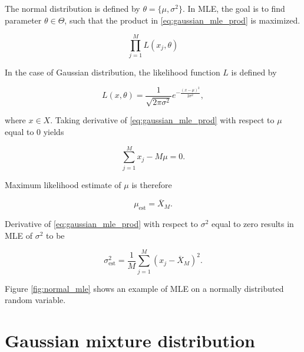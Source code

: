\documentclass[thesis=B,english]{FITthesis}[2012/06/26]
\begin{document}
The normal distribution is defined by $\theta = \{\mu, \sigma^2\}$. In MLE, the goal is to find parameter $\theta \in \Theta$, such that the product in \ref{eq:gaussian_mle_prod} is maximized.

\begin{equation} \label{eq:gaussian_mle_prod}
\prod_{j=1}^{M} L(x_j, \theta)
\end{equation}

In the case of Gaussian distribution, the likelihood function $L$ is defined by

\begin{equation*}
L(x, \theta) = \frac{1}{\sqrt{2 \pi \sigma^2}}e^{-\frac{(x-\mu)^2}{2 \sigma^2}},
\end{equation*}

\medskip
where $x \in X$. Taking derivative of \ref{eq:gaussian_mle_prod} with respect to $\mu$ equal to 0 yields

\begin{equation*}
\sum_{j=1}^{M}{x_j - M \mu} = 0.
\end{equation*}

\bigskip
Maximum likelihood estimate of $\mu$ is therefore

\begin{equation*}
\mu_{\text{est}} = \overline X_M.
\end{equation*}

\medskip
Derivative of \ref{eq:gaussian_mle_prod} with respect to $\sigma^2$ equal to zero results in MLE of $\sigma^2$ to be

\begin{equation*}
\sigma^2_{\text{est}} = \frac{1}{M} \sum_{j=1}^{M} {(x_j-\overline X_M)^2}.
\end{equation*}

Figure \ref{fig:normal_mle} shows an example of MLE on a normally distributed random variable.

\section{Gaussian mixture distribution}
\end{document}
